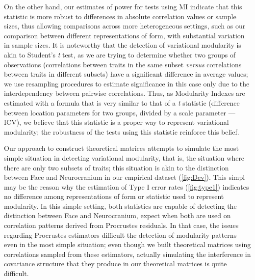 \documentclass[12pt,]{article}
\begin{document}
On the other hand, our estimates of power for tests using MI indicate
that this statistic is more robust to differences in absolute
correlation values or sample sizes, thus allowing comparisons across
more heterogeneous settings, such as our comparison between different
representations of form, with substantial variation in sample sizes. It
is noteworthy that the detection of variational modularity is akin to
Student's \emph{t} test, as we are trying to determine whether two
groups of observations (correlations between traits in the same subset
\emph{versus} correlations between traits in different subsets) have a
significant difference in average values; we use resampling procedures
to estimate significance in this case only due to the interdependency
between pairwise correlations. Thus, as Modularity Indexes are estimated
with a formula that is very similar to that of a \emph{t} statistic
(difference between location parameters for two groups, divided by a
scale parameter --- ICV), we believe that this statistic is a proper way
to represent variational modularity; the robustness of the tests using
this statistic reinforce this belief.

Our approach to construct theoretical matrices attempts to simulate the
most simple situation in detecting variational modularity, that is, the
situation where there are only two subsets of traits; this situation is
akin to the distinction between Face and Neurocranium in our empirical
dataset (\autoref{fig:Dev}). This simpl may be the reason why the
estimation of Type I error rates (\autoref{fig:type1}) indicates no
difference among representations of form or statistic used to represent
modularity. In this simple setting, both statistics are capable of
detecting the distinction between Face and Neurocranium, expect when
both are used on correlation patterns derived from Procrustes residuals.
In that case, the issues regarding Procrustes estimators difficult the
detection of modularity patterns even in the most simple situation; even
though we built theoretical matrices using correlations sampled from
these estimators, actually simulating the interference in covariance
structure that they produce in our theoretical matrices is quite
difficult.
\end{document}
